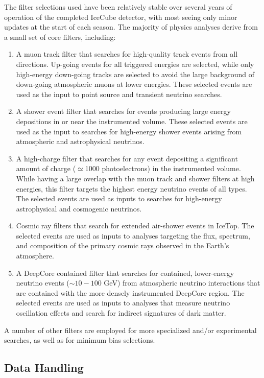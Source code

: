 The filter selections used have been relatively stable over several years
of operation of the completed IceCube detector, with most seeing only minor
updates at the 
start of each season.  The majority of physics analyses derive from a small
set of core filters, including:

\begin{enumerate}
\item A muon track filter that searches for high-quality track events from all
  directions.  Up-going events for all triggered energies are selected,
  while only high-energy 
  down-going tracks are selected to avoid the large background of
  down-going atmospheric muons at lower energies.  These selected events
  are used as the input to point source and transient neutrino searches.
\item A shower event filter that searches for events producing large energy
  depositions in or near the instrumented volume.  These selected events are
  used as the input to searches for high-energy shower events arising from
  atmospheric and astrophysical neutrinos.
\item A high-charge filter that searches for any event depositing a significant
  amount of charge ($\simeq$1000 photoelectrons) in the 
  instrumented volume.  While having a large overlap with the muon track
  and shower filters at high energies, this filter targets the highest
  energy neutrino events of all types. The selected events are used as
  inputs to searches for high-energy astrophysical and cosmogenic
  neutrinos.
\item Cosmic ray filters that search for extended air-shower events in
  IceTop.  The selected events are used as inputs to analyses 
  targeting the flux, spectrum, and composition of the primary cosmic rays
  observed in the Earth's atmosphere.
\item A DeepCore contained filter that searches for contained, lower-energy
  neutrino events ($\sim10-100$ GeV) from atmospheric neutrino interactions
  that are contained with the more densely instrumented DeepCore region.
  The selected events are used as inputs to analyses that measure
  neutrino oscillation effects and search for indirect signatures of dark matter.
\end{enumerate}

A number of other filters are employed for more specialized and/or
experimental searches, as well as for minimum bias selections.

\subsection{\label{sect:online_jade}Data Handling}

